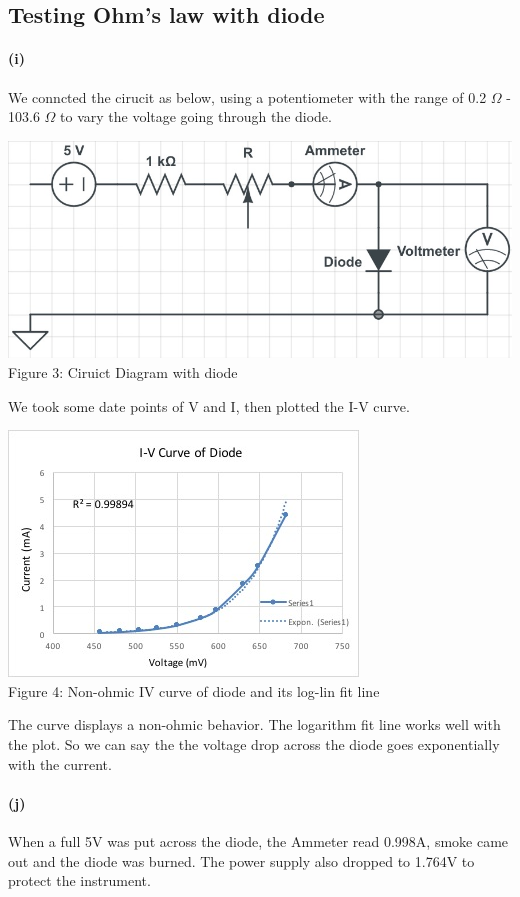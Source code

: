 \documentclass[]{article}
\begin{document}
\subsection*{ Testing Ohm's law with diode}	
	\paragraph{ (i)}
	We conncted the cirucit as below, using a potentiometer with the range of 0.2 $\Omega$ - 103.6 $\Omega$ to vary the voltage going through the diode.
	\begin{center} 
		\includegraphics[scale=0.3]{lab1_diode1}\\			
		Figure 3: Ciruict Diagram with diode
	\end{center}
	We took some date points of V and I, then plotted the I-V curve.
	\begin{center} 
		\includegraphics[scale=0.7]{lab1_diode2}\\			
		Figure 4: Non-ohmic IV curve of diode and its log-lin fit line
	\end{center}
	The curve displays a non-ohmic behavior. The logarithm fit line works well with the plot. So we can say the the voltage drop across the diode goes exponentially with the current. 
	\paragraph{ (j)}
	When a full 5V was put across the diode, the Ammeter read 0.998A, smoke came out and the diode was burned. The power supply also dropped to 1.764V to protect the instrument. 
	
\end{document}
